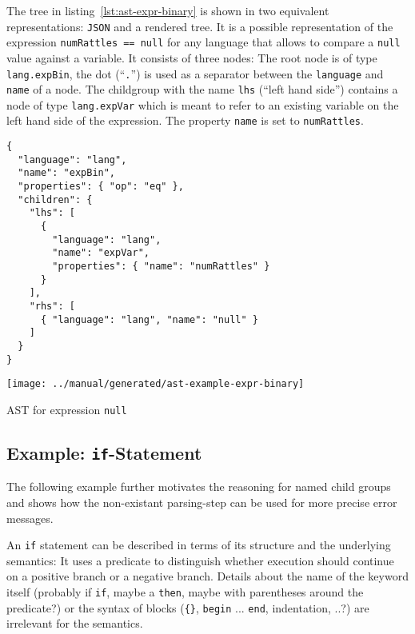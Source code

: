 \documentclass[sigconf,natbib=false,review=true]{acmart}
\newcommand\astScale{0.75}
\begin{document}
The tree in listing~\ref{lst:ast-expr-binary} is shown in two equivalent representations: \texttt{JSON} and a rendered tree. It is a possible representation of the expression \texttt{numRattles == null} for any language that allows to compare a \texttt{null} value against a variable. It consists of three nodes: The root node is of type \texttt{lang.expBin}, the dot (\enquote{\texttt{.}}) is used as a separator between the \texttt{language} and \texttt{name} of a node. The childgroup with the name \texttt{lhs} (\enquote{left hand side}) contains a node of type \texttt{lang.expVar} which is meant to refer to an existing variable on the left hand side of the expression. The property \texttt{name} is set to \texttt{numRattles}.

\begin{listing}[H]
\begin{verbatim}
{
  "language": "lang",
  "name": "expBin",
  "properties": { "op": "eq" },
  "children": {
    "lhs": [
      {
        "language": "lang",
        "name": "expVar",
        "properties": { "name": "numRattles" }
      }
    ],
    "rhs": [
      { "language": "lang", "name": "null" }
    ]
  }
}
\end{verbatim}
\texttt{[image: ../manual/generated/ast-example-expr-binary]}
\caption{AST for expression \texttt{null}}
\label{lst:ast-expr-binary}
\end{listing}

\subsection{Example: \texttt{if}-Statement}

The following example further motivates the reasoning for named child groups and shows how the non-existant parsing-step can be used for more precise error messages.

An \texttt{if} statement can be described in terms of its structure and the underlying semantics: It uses a predicate to distinguish whether execution should continue on a positive branch or a negative branch. Details about the name of the keyword itself (probably if \texttt{if}, maybe a \texttt{then}, maybe with parentheses around the predicate?) or the syntax of blocks (\texttt{\{\}}, \texttt{begin} ... \texttt{end}, indentation, ..?) are irrelevant for the semantics.
\end{document}
